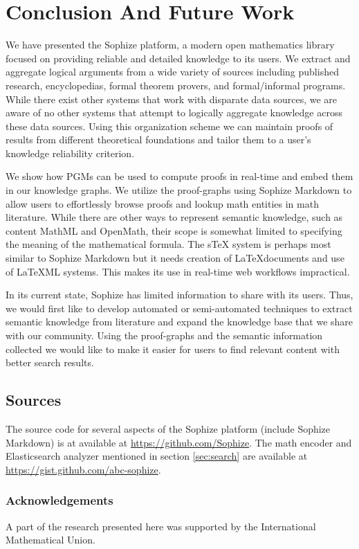 \documentclass[runningheads]{llncs}
\begin{document}
\section{Conclusion And Future Work}
\label{sec:conclusion}

We have presented the Sophize platform, a modern open mathematics library focused on providing reliable and detailed knowledge to its users. We extract and aggregate logical arguments from a wide variety of sources including published research, encyclopedias, formal theorem provers, and formal/informal programs. While there exist other systems that work with disparate data sources, we are aware of no other systems that attempt to logically aggregate knowledge across these data sources. Using this organization scheme we can maintain proofs of results from different theoretical foundations and tailor them to a user's knowledge reliability criterion.

We show how PGMs can be used to compute proofs in real-time and embed them in our knowledge graphs. We utilize the proof-graphs using Sophize Markdown to allow users to effortlessly browse proofs and lookup math entities in math literature. While there are other ways to represent semantic knowledge, such as content MathML and OpenMath, their scope is somewhat limited to specifying the meaning of the mathematical formula. The sTeX system \cite{Kohlhase2008} is perhaps most similar to Sophize Markdown but it needs creation of \LaTeX\space documents and use of \LaTeX ML systems. This makes its use in real-time web workflows impractical.

In its current state, Sophize has limited information to share with its users. Thus, we would first like to develop automated or semi-automated techniques to extract semantic knowledge from literature and expand the knowledge base that we share with our community. Using the proof-graphs and the semantic information collected we would like to make it easier for users to find relevant content with better search results.

\subsection*{Sources}
\label{sec:sources}
The source code for several aspects of the Sophize platform (include Sophize Markdown) is  at available at \url{https://github.com/Sophize}. The math encoder and Elasticsearch analyzer mentioned in section \ref{sec:search} are available at \url{https://gist.github.com/abc-sophize}.

\subsubsection{Acknowledgements} 
A part of the research presented here was supported by the International Mathematical Union.




\end{document}
